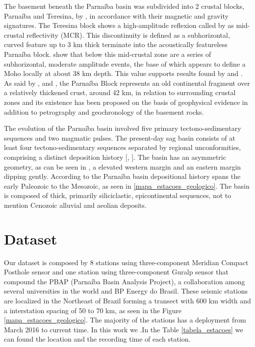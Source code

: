 \documentclass[paper,11pt]{geophysics}
\begin{document}
The basement beneath the Parnaíba basin was subdivided into 2 crustal blocks, Parnaíba and Teresina, by \cite{de_castro_geophysical_2016}, in accordance with their magnetic and gravity signatures. The Teresina block shows a high-amplitude reflexion called by \cite{daly_brasiliano_2014} as mid-crustal reflectivity (MCR). This discontinuity is defined as a subhorizontal, curved feature up to 3 km thick terminate into the acoustically featureless Parnaíba block. \cite{daly_brasiliano_2014} show that below this mid-crustal zone are a series of subhorizontal, moderate amplitude events, the base of which appears to define a Moho locally at about 38 km depth. This value supports results found by \cite{de_castro_crustal_2014} and \cite{de_castro_geophysical_2016}. As said by \cite{fuck_rodinia_2008}, \cite{de_castro_crustal_2014} and \cite{de_castro_geophysical_2016}, the Parnaíba Block represents an old continental fragment over a relatively thickened crust, around 42 km, in relation to surrounding crustal zones and its existence has been proposed on the basis of geophysical evidence in addition to petrography and geochronology of the basement rocks. 

The evolution of the Parnaíba basin involved five primary tectono-sedimentary sequences and two magmatic pulses. The present-day sag basin consists of at least four tectono-sedimentary sequences separated by regional unconformities, comprising a distinct deposition history [\cite{goes_feijo_1994}, \cite{vaz_bacia_2007}]. The basin has an asymmetric geometry, as can be seen in \cite{daly_brasiliano_2014}, a elevated western margin and an eastern margin dipping gently. According to \cite{goes_feijo_1994} the Parnaíba basin depositional history spans the early Paleozoic to the Mesozoic, as seen in \ref{mapa_estacoes_geologico}. The basin is composed of thick, primarily siliciclastic, epicontinental sequences, not to mention Cenozoic alluvial and aeolian deposits.

\section{Dataset}

Our dataset is composed by 8 stations using three-component Meridian Compact Posthole sensor and one station using three-component Guralp sensor that compound the PBAP (Parnaíba Basin Analysis Project), a collaboration among several universities in the world and BP Energy do Brasil. These seismic stations are localized in the Northeast of Brazil forming a transect with 600 km width and a interstation spacing of 50 to 70 km, as seen in the Figure \ref{mapa_estacoes_geologico}. The majority of the stations has a deployment from March 2016 to current time. In this work we .In the Table \ref{tabela_estacoes} we can found the location and the recording time of each station. 
\end{document}
